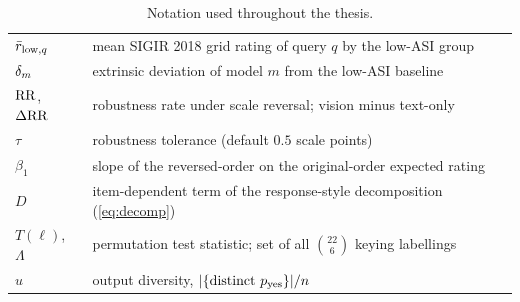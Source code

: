 \begin{table}[htbp]
\begin{tabularx}{\linewidth}{@{}lX@{}}
$\bar r_{\text{low},q}$ & mean SIGIR 2018 grid rating of query $q$ by the low-ASI group \\
$\delta_m$ & extrinsic deviation of model $m$ from the low-ASI baseline \\
$\mathrm{RR}$, $\Delta\mathrm{RR}$ & robustness rate under scale reversal; vision minus text-only \\
$\tau$ & robustness tolerance (default $0.5$ scale points) \\
$\beta_1$ & slope of the reversed-order on the original-order expected rating \\
$D$ & item-dependent term of the response-style decomposition (\cref{eq:decomp}) \\
$T(\bm\ell)$, $\Lambda$ & permutation test statistic; set of all $\binom{22}{6}$ keying labellings \\
$u$ & output diversity, $|\{\text{distinct }p_{\mathrm{yes}}\}|/n$ \\
\bottomrule
\end{tabularx}
\caption{Notation used throughout the thesis.}
\label{tab:notation}
\end{table}
\clearpage
